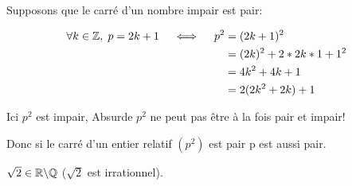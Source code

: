 \documentclass[a4paper, 12pt]{article}
\begin{document}
\begin{demonstration}
    Supposons que le carré d'un nombre impair est pair:

    \begin{align*}
        \forall k \in \mathbb{Z}, \; p = 2k + 1 \quad \iff \quad p^2 =&\; (2k + 1)^2 \\
         =&\; (2k)^2 + 2*2k*1 + 1^2 \\
         =&\; 4k^2 + 4k + 1 \\
         =&\; 2(2k^2 + 2k) + 1
    \end{align*}

    
    Ici $p^2$ est impair, Absurde $p^2$ ne peut pas être à la fois pair et impair!
    \begin{rdem}
        Donc si le carré d'un entier relatif $(p^2)$ est pair p est aussi pair.
    \end{rdem}

\end{demonstration}

\begin{proposition}
    $\sqrt{2} \in \mathbb{R} \backslash \mathbb{Q}$ ($\sqrt{2}$ est irrationnel).
\end{proposition}
\end{document}
